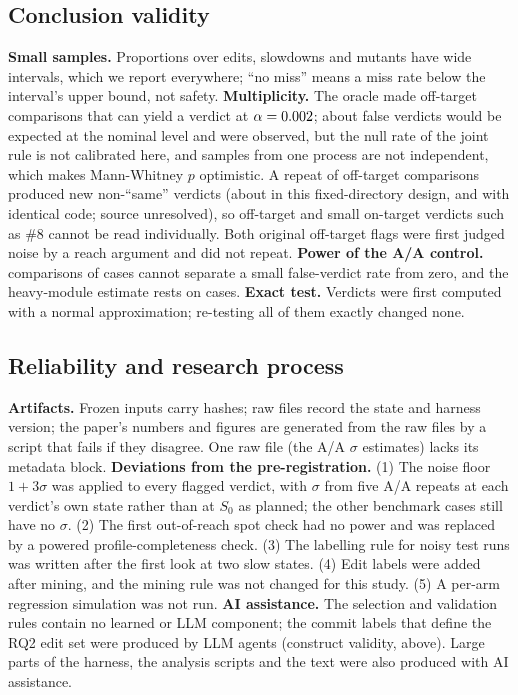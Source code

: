 \subsection{Conclusion validity}
\textbf{Small samples.} Proportions over \NxAgentOpt{} edits, \NumSlowdowns{} slowdowns and \MutantsKilled{} mutants have wide intervals, which we report everywhere; ``no miss'' means a miss rate below the interval's upper bound, not safety.
\textbf{Multiplicity.} The oracle made \OffTargetVerdictable{} off-target comparisons that can yield a verdict at $\alpha=0.002$; about \OffTargetExpected{} false verdicts would be expected at the nominal level and \OffTargetObserved{} were observed, but the null rate of the joint rule is not calibrated here, and samples from one process are not independent, which makes Mann-Whitney $p$ optimistic. A repeat of \TwoTotal{} off-target comparisons produced \TwoFlips{} new non-``same'' verdicts (about \TwoFlipPct\pct{} in this fixed-directory design, and \DirAAPct\pct{} with identical code; source unresolved), so off-target and small on-target verdicts such as \#8 cannot be read individually. Both original off-target flags were first judged noise by a reach argument and did not repeat.
\textbf{Power of the A/A control.} \AAComparisons{} comparisons of \AACases{} cases cannot separate a small false-verdict rate from zero, and the heavy-module estimate rests on \AAAlgoCases{} cases. 
\textbf{Exact test.} Verdicts were first computed with a normal approximation; re-testing all of them exactly changed none.

\subsection{Reliability and research process}
\label{sec:deviations}
\textbf{Artifacts.} Frozen inputs carry hashes; raw files record the state and harness version; the paper's numbers and figures are generated from the raw files by a script that fails if they disagree. One raw file (the A/A $\sigma$ estimates) lacks its metadata block. 
\textbf{Deviations from the pre-registration.} (1) The noise floor $1+3\sigma$ was applied to every flagged verdict, with $\sigma$ from five A/A repeats at each verdict's own state rather than at $S_0$ as planned; the other benchmark cases still have no $\sigma$. (2) The first out-of-reach spot check had no power and was replaced by a powered profile-completeness check. (3) The labelling rule for noisy test runs was written after the first look at two slow states. (4) Edit labels were added after mining, and the mining rule was not changed for this study. (5) A per-arm regression simulation was not run. 
\textbf{AI assistance.} The selection and validation rules contain no learned or LLM component; the commit labels that define the RQ2 edit set were produced by LLM agents (construct validity, above). Large parts of the harness, the analysis scripts and the text were also produced with AI assistance. 
